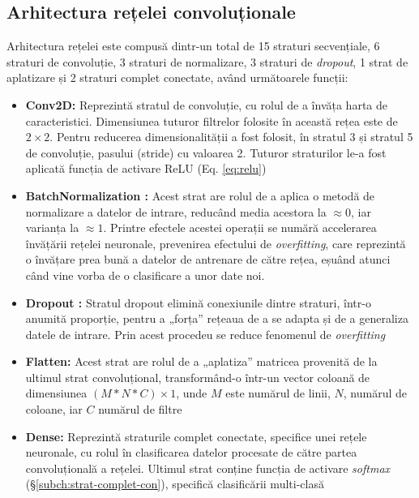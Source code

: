 \subsection{Arhitectura rețelei convoluționale}
Arhitectura rețelei este compusă dintr-un total de 15 straturi secvențiale, 6 straturi de convoluție, 3 straturi de normalizare, 3 straturi de \textit{dropout}, 1 strat de aplatizare și 2 straturi complet conectate, având următoarele funcții:
\begin{itemize}
\item \textbf{Conv2D:} Reprezintă stratul de convoluție, cu rolul de a învăța harta de caracteristici. Dimensiunea tuturor filtrelor folosite în această rețea este de $2\times2$. Pentru reducerea dimensionalității a fost folosit, în stratul 3 și stratul 5 de convoluție, pasului (stride) cu valoarea 2. Tuturor straturilor le-a fost aplicată funcția de activare ReLU (Eq. \ref{eq:relu})
\item \textbf{BatchNormalization \textnormal{\cite{ioffe2015batch}}:} Acest strat are rolul de a aplica o metodă de normalizare a datelor de intrare, reducând media acestora la $\approx0$, iar varianța la $\approx1$. Printre efectele acestei operații se numără accelerarea învățării rețelei neuronale, prevenirea efectului de \textit{overfitting}, care reprezintă o învățare prea bună a datelor de antrenare de către rețea, eșuând atunci când vine vorba de o clasificare a unor date noi.
\item \textbf{Dropout \textnormal{\cite{hinton2012improving-dropout}}:} Stratul dropout elimină conexiunile dintre straturi, într-o anumită proporție, pentru a „forța” rețeaua de a se adapta și de a generaliza datele de intrare. Prin acest procedeu se reduce fenomenul de \textit{overfitting}
\item \textbf{Flatten:} Acest strat are rolul de a „aplatiza” matricea provenită de la ultimul strat convoluțional, transformând-o într-un vector coloană de dimensiunea $(M*N*C)\times1$, unde $M$ este numărul de linii, $N$, numărul de coloane, iar $C$ numărul de filtre
\item \textbf{Dense:} Reprezintă straturile complet conectate, specifice unei rețele neuronale, cu rolul în clasificarea datelor procesate de către partea convoluțională a rețelei. Ultimul strat conține funcția de activare \textit{softmax} (\S\ref{subch:strat-complet-con}), specifică clasificării multi-clasă
\end{itemize}

